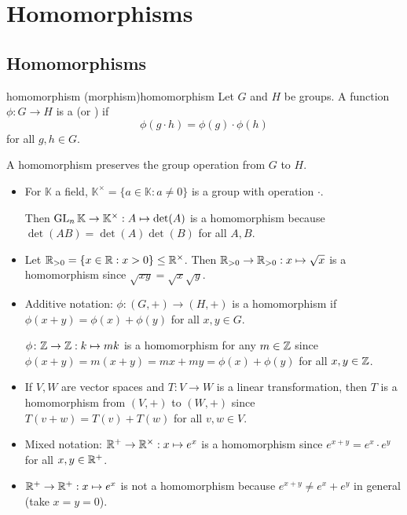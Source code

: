 \documentclass[12pt,letterpaper]{report}
\begin{document}
\section{Homomorphisms}

\subsection{Homomorphisms}

\begin{defn}{homomorphism (morphism)}{homomorphism}
  Let $G$ and $H$ be groups.
  A function $\phi \colon G \to H$ is a  (or ) if
  \[ \phi(g \cdot h) = \phi(g) \cdot \phi(h) \]
  for all $g, h \in G$.
\end{defn}

A homomorphism preserves the group operation from $G$ to $H$.

\begin{ex}
  \begin{itemize}
    \item
    For $\mathbb{K}$ a field, $\mathbb{K}^\times = \{a \in \mathbb{K} : a \neq 0\}$ is a group with
    operation $\cdot$.

    Then $\operatorname{GL}_n \mathbb{K} \to \mathbb{K}^\times : A \mapsto \det(A)$ is a homomorphism because
    $\det(AB) = \det(A) \det(B)$ for all $A, B$.
    \item
    Let $\mathbb{R}_{> 0} = \{x \in \mathbb{R} : x > 0\} \leq \mathbb{R}^\times$.
    Then $\mathbb{R}_{> 0} \to \mathbb{R}_{> 0} : x \mapsto \sqrt{x}$ is a homomorphism since
    $\sqrt{xy} = \sqrt{x} \sqrt{y}$.
    \item
    Additive notation: $\phi \colon (G, +) \to (H, +)$ is a homomorphism if
    $\phi(x + y) = \phi(x) + \phi(y)$ for all $x, y \in G$.

    $\phi \colon \mathbb{Z} \to \mathbb{Z} : k \mapsto mk$ is a homomorphism for any
    $m \in \mathbb{Z}$ since $\phi(x + y) = m(x + y) = mx + my = \phi(x) + \phi(y)$ for all
    $x, y \in \mathbb{Z}$.
    \item
    If $V, W$ are vector spaces and $T \colon V \to W$ is a linear transformation, then $T$ is a
    homomorphism from $(V, +)$ to $(W, +)$ since $T(v + w) = T(v) + T(w)$ for all $v, w \in V$.
    \item
    Mixed notation: $\mathbb{R}^+ \to \mathbb{R}^\times : x \mapsto e^x$ is a homomorphism since
    $e^{x + y} = e^x \cdot e^y$ for all $x, y \in \mathbb{R}^+$.
    \item
    $\mathbb{R}^+ \to \mathbb{R}^+ : x \mapsto e^x$ is not a homomorphism because
    $e^{x + y} \neq e^x + e^y$ in general (take $x = y = 0$).
  \end{itemize}
\end{ex}
\end{document}
